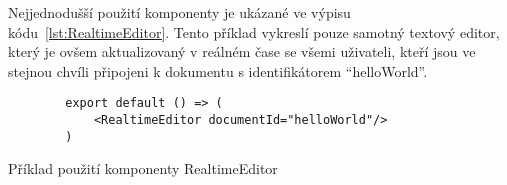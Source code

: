 Nejjednodušší použití komponenty je ukázané ve výpisu kódu~\ref{lst:RealtimeEditor}.
Tento příklad vykreslí pouze samotný textový editor, který je ovšem aktualizovaný v reálném čase se všemi uživateli, kteří jsou ve stejnou chvíli připojeni k dokumentu s identifikátorem \enquote{helloWorld}.

\begin{listing}[ht!]
    \begin{verbatim}
        export default () => (
            <RealtimeEditor documentId="helloWorld"/>
        )
    \end{verbatim}

    \caption{Příklad použití komponenty RealtimeEditor}\label{lst:RealtimeEditor}
\end{listing}
